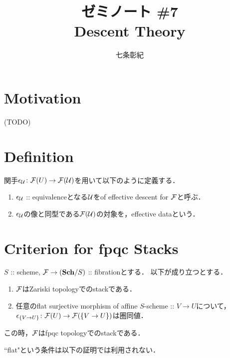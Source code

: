 \documentclass[a4paper, dvipdfmx]{jsarticle}
\begin{document}
\title{ゼミノート \#7 \\ Descent Theory}
\author{七条彰紀}
\maketitle

\newcommand{\QCoh}{\mathbf{QCoh}}
\newcommand{\Mod}{\mathbf{Mod}}
\newcommand{\vsim}{\text{\rotatebox{-90}{$\sim$}}}

\section{Motivation}
    (TODO)

\section{Definition}
\begin{Def}
    関手$\epsilon_{\mathcal{U}} \colon \mathcal{F}(U) \to \mathcal{F}(\mathcal{U})$を用いて以下のように定義する．
    \begin{enumerate}[label=(\roman*)]
        \item
            $\epsilon_{\mathcal{U}}$ :: equivalenceとなる$\mathcal{U}$をof effective descent for $\mathcal{F}$と呼ぶ．
        \item
            $\epsilon_{\mathcal{U}}$の像と同型である$\mathcal{F}(\mathcal{U})$の対象を，effective dataという．
    \end{enumerate}
\end{Def}

\section{Criterion for fpqc Stacks}
\begin{Thm}\label{thm:fpqccriterion}
    $S$ :: scheme,
    $\mathcal{F} \to (\mathbf{Sch}/S)$ :: fibrationとする．
    以下が成り立つとする．
    \begin{enumerate}[label=(\alph*)]
        \item $\mathcal{F}$はZariski topologyでのstackである．
        \item
            任意のflat surjective morphism of affine $S$-scheme :: $V \to U$について，\mnewline
            $\epsilon_{\{V \to U\}} \colon \mathcal{F}(U) \to \mathcal{F}(\{V \to U\})$は圏同値．
    \end{enumerate}
    この時，$\mathcal{F}$はfpqc topologyでのstackである．
\end{Thm}

\begin{Remark}
    ``flat"という条件は以下の証明では利用されない．
\end{Remark}
\end{document}

